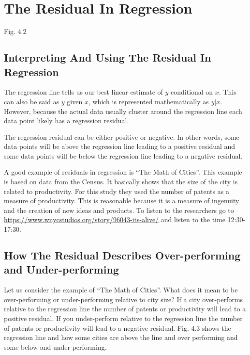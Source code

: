\documentclass[]{book}
\theoremstyle{definition}
\theoremstyle{definition}
\theoremstyle{definition}
\theoremstyle{remark}
\begin{document}
\hypertarget{the-residual-in-regression-1}{%
\section{The Residual In
Regression}\label{the-residual-in-regression-1}}

Fig. 4.2

\hypertarget{interpreting-and-using-the-residual-in-regression}{%
\subsection{Interpreting And Using The Residual In
Regression}\label{interpreting-and-using-the-residual-in-regression}}

The regression line tells us our best linear estimate of \(y\)
conditional on \(x\). This can also be said as \(y\) given \(x\), which
is represented mathematically as \({y|x}\). However, because the actual
data usually cluster around the regression line each data point likely
has a regression residual.

The regression residual can be either positive or negative. In other
words, some data points will be above the regression line leading to a
positive residual and some data points will be below the regression line
leading to a negative residual.

A good example of residuals in regression is ``The Math of Cities''.
This example is based on data from the Census. It basically shows that
the size of the city is related to productivity. For this study they
used the number of patents as a measure of productivity. This is
reasonable because it is a measure of ingenuity and the creation of new
ideas and products. To listen to the researchers go to
\url{https://www.wnycstudios.org/story/96043-its-alive/} and listen to
the time 12:30-17:30.

\hypertarget{how-the-residual-describes-over-performing-and-under-performing}{%
\subsection{How The Residual Describes Over-performing and
Under-performing}\label{how-the-residual-describes-over-performing-and-under-performing}}

Let us consider the example of ``The Math of Cities''. What does it mean
to be over-performing or under-performing relative to city size? If a
city over-performs relative to the regression line the number of patents
or productivity will lead to a positive residual. If you under-perform
relative to the regression line the number of patents or productivity
will lead to a negative residual. Fig. 4.3 shows the regression line and
how some cities are above the line and over performing and some below
and under-performing.
\end{document}
